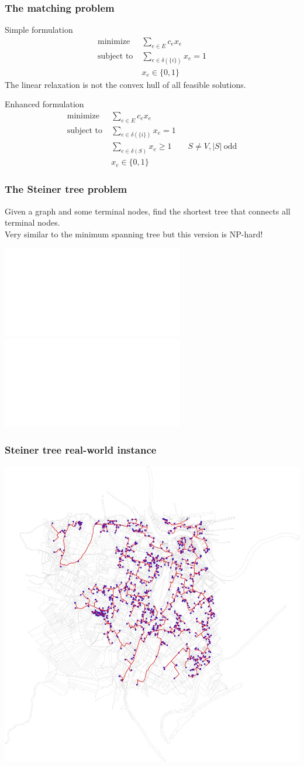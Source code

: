 \documentclass[9pt,handout]{beamer}
\begin{document}
\begin{frame}
\frametitle{The matching problem}
\begin{block}{Simple formulation}
\begin{align*} 
\text{minimize} \;&\sum_{e\in E} c_ex_e\\
\text{subject to}\;& \sum_{e\in \delta(\{i\})} x_e = 1\\
& x_e\in \{0,1\}
\end{align*}
The linear relaxation is \alert{not the convex hull} of all
feasible solutions.
\end{block}
\begin{block}{Enhanced formulation}
\begin{align*} 
\text{minimize} \;&\sum_{e\in E} c_ex_e\\
\text{subject to}\;& \sum_{e\in \delta(\{i\})} x_e = 1\\
&\sum_{e\in \delta(S)}x_e\geq 1\qquad S\neq V, |S| \ \text{odd}\\
& x_e\in \{0,1\}
\end{align*}
\end{block}
\end{frame}
\begin{frame}
\frametitle{The Steiner tree problem}
Given a graph and some \alert{terminal nodes},
find the shortest tree that connects all terminal nodes.\\
Very similar to the minimum spanning tree but this version is \alert{NP-hard}!
\begin{center}
\includegraphics<1>[width=.5\linewidth]{steiner_instance.pdf}
\includegraphics<2>[width=.5\linewidth]{steiner_sol.pdf}
\end{center}
\end{frame}
\begin{frame}
\frametitle{Steiner tree real-world instance}
\begin{center}
\includegraphics[width=\linewidth]{U-G107.jpg}
\end{center}
\end{frame}
\end{document}
